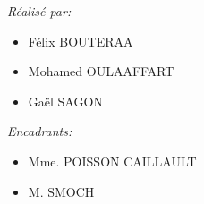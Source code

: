 \begin{titlepage}
\begin{sffamily}
\begin{center}
    \begin{minipage}{0.4\textwidth}
      \begin{flushleft} \large
\emph{Réalisé par:} \\
\begin{itemize} 
         \item  Félix \textsc{BOUTERAA}
	 \item  Mohamed \textsc{OULAAFFART}
	 \item    Gaël \textsc{SAGON}
     
\end{itemize} 
        \emph{}
      \end{flushleft}
    \end{minipage}
    \begin{minipage}{0.4\textwidth}
      \begin{flushright} \large
        \emph{Encadrants:}
\begin{itemize} 
     \item    Mme. \textsc{POISSON CAILLAULT}
     \item   M. \textsc{SMOCH}
\end{itemize}
        \emph{}
      \end{flushright}
    \end{minipage}

    \vfill
  \end{center}
  \end{sffamily}
\end{titlepage}